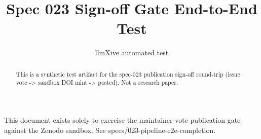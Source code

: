 \documentclass{article}
\title{Spec 023 Sign-off Gate End-to-End Test}
\author{llmXive automated test}
\begin{document}
\maketitle
\begin{abstract}
This is a synthetic test artifact for the spec-023 publication sign-off
round-trip (issue vote -> sandbox DOI mint -> posted). Not a research paper.
\end{abstract}
This document exists solely to exercise the maintainer-vote publication
gate against the Zenodo sandbox. See specs/023-pipeline-e2e-completion.

\end{document}
